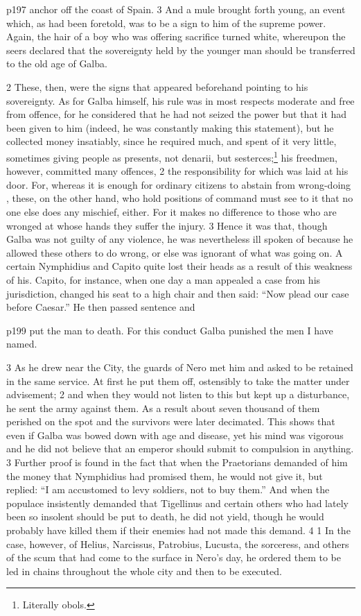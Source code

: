 p197 anchor off the coast of Spain. 3 And a mule brought forth young, an event which, as had been foretold, was to be a sign to him of the supreme power. Again, the hair of a boy who was offering sacrifice turned white, whereupon the seers declared that the sovereignty held by the younger man should be transferred to the old age of Galba.

2 These, then, were the signs that appeared beforehand pointing to his sovereignty. As for Galba himself, his rule was in most respects moderate and free from offence, for he considered that he had not seized the power but that it had been given to him (indeed, he was constantly making this statement), but he collected money insatiably, since he required much, and spent of it very little, sometimes giving people as presents, not denarii, but sesterces;\texthebrew{⁠}\footnote{Literally obols.

} his freedmen, however, committed many offences, 2 the responsibility for which was laid at his door. For, whereas it is enough for ordinary citizens to abstain from wrong-doing , these, on the other hand, who hold positions of command must see to it that no one else does any mischief, either. For it makes no difference to those who are wronged at whose hands they suffer the injury. 3 Hence it was that, though Galba was not guilty of any violence, he was nevertheless ill spoken of because he allowed these others to do wrong, or else was ignorant of what was going on. A certain Nymphidius and Capito quite lost their heads as a result of this weakness of his. Capito, for instance, when one day a man appealed a case from his jurisdiction, changed his seat to a high chair and then said: ``Now plead our case before Caesar.'' He then passed sentence and

p199 put the man to death. For this conduct Galba punished the men I have named.

3 As he drew near the City, the guards of Nero met him and asked to be retained in the same service. At first he put them off, ostensibly to take the matter under advisement; 2 and when they would not listen to this but kept up a disturbance, he sent the army against them. As a result about seven thousand of them perished on the spot and the survivors were later decimated. This shows that even if Galba was bowed down with age and disease, yet his mind was vigorous and he did not believe that an emperor should submit to compulsion in anything. 3 Further proof is found in the fact that when the Praetorians demanded of him the money that Nymphidius had promised them, he would not give it, but replied: ``I am accustomed to levy soldiers, not to buy them.'' And when the populace insistently demanded that Tigellinus and certain others who had lately been so insolent should be put to death, he did not yield, though he would probably have killed them if their enemies had not made this demand. 4 1 In the case, however, of Helius, Narcissus, Patrobius, Lucusta, the sorceress, and others of the scum that had come to the surface in Nero's day, he ordered them to be led in chains throughout the whole city and then to be executed.

